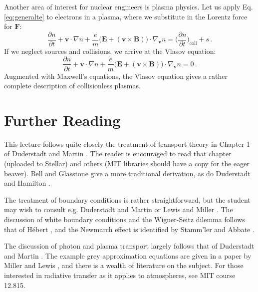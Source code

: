 Another area of interest for nuclear engineers is plasma physics.  Let us apply Eq. \ref{eq:generalte} to electrons in a plasma, where we substitute in the Lorentz force for $\mathbf{F}$:
\begin{equation}
  \frac{\partial n}{\partial t} 
   + \mathbf{v} \cdot \nabla n + \frac{e}{m} \Big ( \mathbf{E}+(\mathbf{v}\times \mathbf{B} ) \Big ) \cdot \nabla_{\mathbf{v}} n =   \Big( \frac{\partial n}{\partial t} \Big )_{\mathrm{coll}} +  s \, .
\end{equation}
If we neglect sources and collisions, we arrive at the Vlasov equation:
\begin{equation}
  \frac{\partial n}{\partial t} 
   + \mathbf{v} \cdot \nabla n + \frac{e}{m} \Big ( \mathbf{E}+(\mathbf{v}\times \mathbf{B} ) \Big ) \cdot \nabla_{\mathbf{v}} n =  0 \, .
\end{equation}
Augmented with Maxwell's equations, the Vlasov equation gives a rather complete description of collisionless plasmas.  



\section*{Further Reading}
This lecture follows quite closely the treatment of transport theory in Chapter 1 of Duderstadt and Martin \cite{duderstadt1976tt}.  The reader is encouraged to read that chapter (uploaded to Stellar) and others (MIT libraries should have a copy for the eager beaver).  Bell and Glasstone \cite{bell1970nrt} give a more traditional derivation, as do Duderstadt and Hamilton \cite{duderstadt1976nra}.
 
The treatment of boundary conditions is rather straightforward, but the student may wish to consult e.g. Duderstadt and Martin \cite{duderstadt1976tt} or Lewis and Miller \cite{lewis1993cmn}.  The discussion of white boundary conditions and the Wigner-Seitz dilemma follows that of H\'{e}bert \cite{hebert2009arp}, and the Newmarch effect is identified by Stamm'ler and Abbate \cite{stammler1983mss}.   

The discussion of photon and plasma transport largely follows that of Duderstadt and Martin \cite{duderstadt1976tt}.  The example grey approximation equations are given in a paper by Miller and Lewis \cite{miller1987nrm}, and there is a wealth of literature on the subject.  For those interested in radiative transfer as it applies to atmospheres, see MIT course 12.815.

